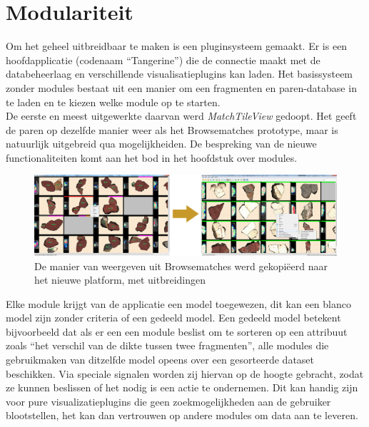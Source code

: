 \section{Modulariteit}
Om het geheel uitbreidbaar te maken is een pluginsysteem gemaakt. Er is een hoofdapplicatie (codenaam ``Tangerine'') die de connectie maakt met de databeheerlaag en verschillende visualisatieplugins kan laden. Het basissysteem zonder modules bestaat uit een manier om een fragmenten en paren-database in te laden en te kiezen welke module op te starten.\\

De eerste en meest uitgewerkte daarvan werd \emph{MatchTileView} gedoopt. Het geeft de paren op dezelfde manier weer als het Browsematches prototype, maar is natuurlijk uitgebreid qua mogelijkheiden. De bespreking van de nieuwe functionaliteiten komt aan het bod in het hoofdstuk over modules.\\

\begin{figure}[ht]
	\begin{center}
		\includegraphics[width=1.0\columnwidth]{images/browsematches-to-tangerine-01.png}
		\caption{De manier van weergeven uit Browsematches werd gekopi\"eerd naar het nieuwe platform, met uitbreidingen}
		\label{fig:browsematchestotang}
	\end{center}
\end{figure}

Elke module krijgt van de applicatie een model toegewezen, dit kan een blanco model zijn zonder criteria of een gedeeld model. Een gedeeld model betekent bijvoorbeeld dat als er een een module beslist om te sorteren op een attribuut zoals ``het verschil van de dikte tussen twee fragmenten'', alle modules die gebruikmaken van ditzelfde model opeens over een gesorteerde dataset beschikken. Via speciale signalen worden zij hiervan op de hoogte gebracht, zodat ze kunnen beslissen of het nodig is een actie te ondernemen. Dit kan handig zijn voor pure visualizatieplugins die geen zoekmogelijkheden aan de gebruiker blootstellen, het kan dan vertrouwen op andere modules om data aan te leveren.\\

